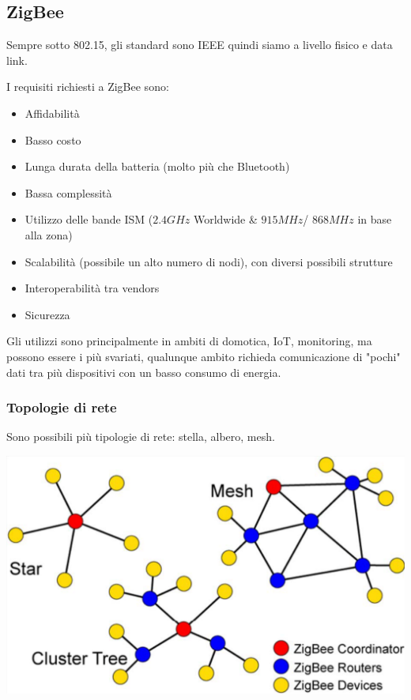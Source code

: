 \subsection{ZigBee}
Sempre sotto 802.15, gli standard sono IEEE quindi siamo a livello fisico e data link.

I requisiti richiesti a ZigBee sono: 
\begin{itemize}
	\item Affidabilità

	\item Basso costo

	\item Lunga durata della batteria (molto più che Bluetooth)

	\item Bassa complessità

	\item Utilizzo delle bande ISM ($2.4GHz$ Worldwide \& $915 MHz$/ $868MHz$ in base alla zona)

	\item Scalabilità (possibile un alto numero di nodi), con diversi possibili strutture

	\item Interoperabilità tra vendors

	\item Sicurezza
\end{itemize}

Gli utilizzi sono principalmente in ambiti di domotica, IoT, monitoring, ma possono essere i più svariati, qualunque ambito richieda comunicazione di "pochi" dati tra più dispositivi con un basso consumo di energia.

\subsubsection{Topologie di rete}

Sono possibili più tipologie di rete: stella, albero, mesh.
\begin{center}
	\includegraphics[width=0.5\linewidth]{img/wpan/ztopology}
\end{center}

